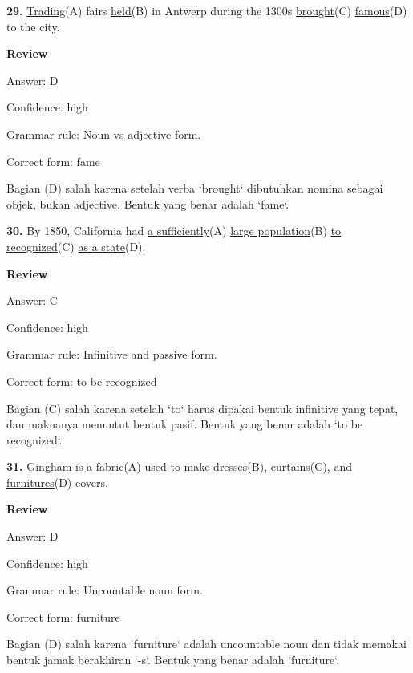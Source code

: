 \documentclass[12pt]{article}
\begin{document}
\endgroup
\par
\vspace{\questionblockgap}
\noindent\textbf{29.} \uline{Trading}(A) fairs \uline{held}(B) in Antwerp during the 1300s \uline{brought}(C) \uline{famous}(D) to the city.
\par
\begingroup
\setlength{\parskip}{0pt}
\setlength{\parindent}{0pt}
\textbf{Review}\par
Answer: D\par
Confidence: high\par
Grammar rule: Noun vs adjective form.\par
Correct form: fame\par
Bagian (D) salah karena setelah verba `brought` dibutuhkan nomina sebagai objek, bukan adjective. Bentuk yang benar adalah `fame`.\par
\endgroup
\par
\vspace{\questionblockgap}
\noindent\textbf{30.} By 1850, California had \uline{a sufficiently}(A) \uline{large population}(B) \uline{to recognized}(C) \uline{as a state}(D).
\par
\begingroup
\setlength{\parskip}{0pt}
\setlength{\parindent}{0pt}
\textbf{Review}\par
Answer: C\par
Confidence: high\par
Grammar rule: Infinitive and passive form.\par
Correct form: to be recognized\par
Bagian (C) salah karena setelah `to` harus dipakai bentuk infinitive yang tepat, dan maknanya menuntut bentuk pasif. Bentuk yang benar adalah `to be recognized`.\par
\endgroup
\par
\vspace{\questionblockgap}
\noindent\textbf{31.} Gingham is \uline{a fabric}(A) used to make \uline{dresses}(B), \uline{curtains}(C), and \uline{furnitures}(D) covers.
\par
\begingroup
\setlength{\parskip}{0pt}
\setlength{\parindent}{0pt}
\textbf{Review}\par
Answer: D\par
Confidence: high\par
Grammar rule: Uncountable noun form.\par
Correct form: furniture\par
Bagian (D) salah karena `furniture` adalah uncountable noun dan tidak memakai bentuk jamak berakhiran `-s`. Bentuk yang benar adalah `furniture`.\par
\end{document}
